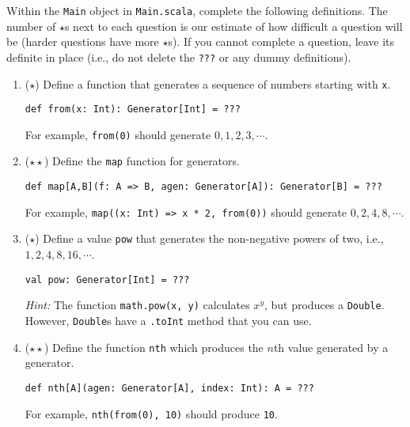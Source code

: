 \documentclass[9pt]{extbook}
\begin{document}
Within the \lstinline|Main| object in \lstinline|Main.scala|, complete
the following definitions. The number of $\star$s next to each question is
our estimate of how difficult a question will be (harder questions have more 
$\star$s). If you cannot complete a question, leave its definite in place
(i.e., do not delete the \lstinline|???| or any dummy definitions).

\begin{enumerate}

  \item ($\star$) Define a function that generates a sequence of numbers
  starting with \lstinline|x|.

\begin{lstlisting}
def from(x: Int): Generator[Int] = ???
\end{lstlisting}
  
   For example, \lstinline|from(0)| should generate $0, 1, 2, 3, \cdots$.

  \item ($\star\star$) Define the \lstinline|map| function for generators.

\begin{lstlisting}
def map[A,B](f: A => B, agen: Generator[A]): Generator[B] = ???
\end{lstlisting}

  For example, \lstinline|map((x: Int) => x * 2, from(0))| should generate
  $0, 2, 4, 8, \cdots$.


  \item ($\star$) Define a value \lstinline|pow| that generates
  the non-negative powers of two, i.e., $1, 2, 4, 8, 16, \cdots$.

\begin{lstlisting}
val pow: Generator[Int] = ???
\end{lstlisting}

  \emph{Hint:} The function \lstinline|math.pow(x, y)| calculates $x^y$, but
  produces a \lstinline|Double|.
  However, \lstinline|Double|s have a \lstinline|.toInt| method that you can
  use.

\item ($\star\star$) Define the function \lstinline|nth| which produces
  the $n$th value generated by a generator.

\begin{lstlisting}
def nth[A](agen: Generator[A], index: Int): A = ???
\end{lstlisting}
  
  For example, \lstinline|nth(from(0), 10)| should produce \lstinline|10|.


\end{enumerate}
\end{document}
